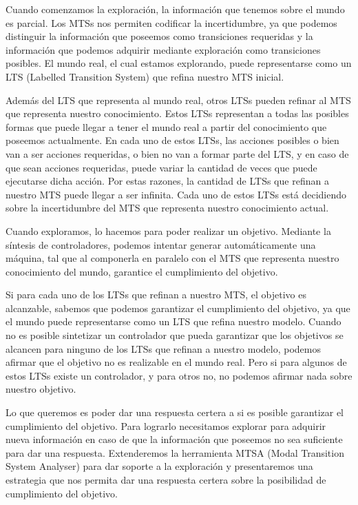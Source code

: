 Cuando comenzamos la exploración, la información que tenemos sobre el mundo es parcial. Los MTSs nos permiten codificar
la incertidumbre, ya que podemos distinguir la información que poseemos como transiciones requeridas y la información
que podemos adquirir mediante exploración como transiciones posibles. El mundo real, el cual estamos explorando, puede 
representarse como un LTS (Labelled Transition System) que refina nuestro MTS inicial.

Además del LTS que representa al mundo real, otros LTSs pueden refinar al MTS que representa nuestro conocimiento. Estos
LTSs representan a todas las posibles formas que puede llegar a tener el mundo real a partir del conocimiento que poseemos
actualmente. En cada uno de estos LTSs, las acciones posibles o bien van a ser acciones requeridas, o bien no van a formar
parte del LTS, y en caso de que sean acciones requeridas, puede variar la cantidad de veces que puede ejecutarse dicha acción.
Por estas razones, la cantidad de LTSs que refinan a nuestro MTS puede llegar a ser infinita. Cada uno de estos LTSs está
decidiendo sobre la incertidumbre del MTS que representa nuestro conocimiento actual.

Cuando exploramos, lo hacemos para poder realizar un objetivo. Mediante la síntesis de controladores, podemos intentar 
generar automáticamente una máquina, tal que al componerla en paralelo con el MTS que representa nuestro conocimiento 
del mundo, garantice el cumplimiento del objetivo.

Si para cada uno de los LTSs que refinan a nuestro MTS, el objetivo es alcanzable, sabemos que podemos garantizar el
cumplimiento del objetivo, ya que el mundo puede representarse como un LTS que refina nuestro modelo. Cuando no es posible
sintetizar un controlador que pueda garantizar que los objetivos se alcancen para ninguno de los LTSs que refinan a nuestro
modelo, podemos afirmar que el objetivo no es realizable en el mundo real. Pero si para algunos de estos LTSs existe un
controlador, y para otros no, no podemos afirmar nada sobre nuestro objetivo.

Lo que queremos es poder dar una respuesta certera a si es posible garantizar el cumplimiento del objetivo. 
Para lograrlo necesitamos explorar para adquirir nueva información en caso de que la información que poseemos no sea 
suficiente para dar una respuesta. Extenderemos la herramienta MTSA (Modal Transition System Analyser) para dar soporte 
a la exploración y presentaremos una estrategia que nos permita dar una respuesta certera sobre la posibilidad de 
cumplimiento del objetivo.

